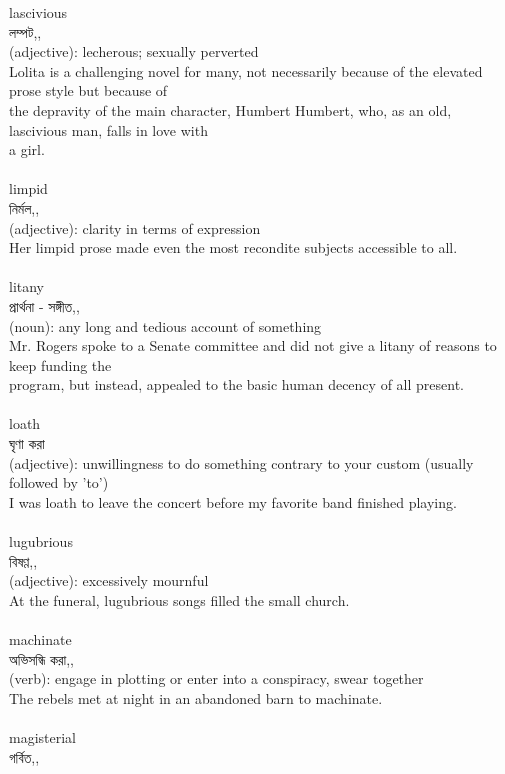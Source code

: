 \documentclass{article}
\begin{document}
{{lascivious}\\
{লম্পট,,}\\
{(adjective): lecherous; sexually perverted\\Lolita is a challenging novel for many, not necessarily because of the elevated prose style but because of\\the depravity of the main character, Humbert Humbert, who, as an old, lascivious man, falls in love with\\a girl.\\}\\
{limpid}\\
{নির্মল,,}\\
{(adjective): clarity in terms of expression\\Her limpid prose made even the most recondite subjects accessible to all.\\}\\
{litany}\\
{প্রার্থনা - সঙ্গীত,,}\\
{(noun): any long and tedious account of something\\Mr. Rogers spoke to a Senate committee and did not give a litany of reasons to keep funding the\\program, but instead, appealed to the basic human decency of all present.\\}\\
{loath}\\
{ঘৃণা করা}\\
{(adjective): unwillingness to do something contrary to your custom (usually followed by 'to')\\I was loath to leave the concert before my favorite band finished playing.\\}\\
{lugubrious}\\
{বিষণ্ণ,,}\\
{(adjective): excessively mournful\\At the funeral, lugubrious songs filled the small church.\\}\\
{machinate}\\
{অভিসন্ধি করা,,}\\
{(verb): engage in plotting or enter into a conspiracy, swear together\\The rebels met at night in an abandoned barn to machinate.\\}\\
{magisterial}\\
{গর্বিত,,}\\
}
\end{document}
